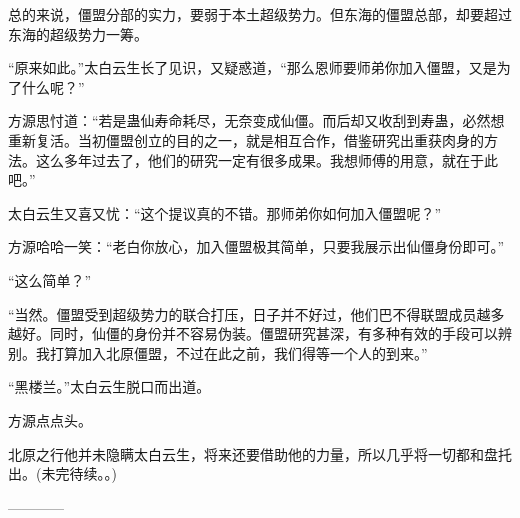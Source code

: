 \begin{this_body}
总的来说，僵盟分部的实力，要弱于本土超级势力。但东海的僵盟总部，却要超过东海的超级势力一筹。

“原来如此。”太白云生长了见识，又疑惑道，“那么恩师要师弟你加入僵盟，又是为了什么呢？”

方源思忖道：“若是蛊仙寿命耗尽，无奈变成仙僵。而后却又收刮到寿蛊，必然想重新复活。当初僵盟创立的目的之一，就是相互合作，借鉴研究出重获肉身的方法。这么多年过去了，他们的研究一定有很多成果。我想师傅的用意，就在于此吧。”

太白云生又喜又忧：“这个提议真的不错。那师弟你如何加入僵盟呢？”

方源哈哈一笑：“老白你放心，加入僵盟极其简单，只要我展示出仙僵身份即可。”

“这么简单？”

“当然。僵盟受到超级势力的联合打压，日子并不好过，他们巴不得联盟成员越多越好。同时，仙僵的身份并不容易伪装。僵盟研究甚深，有多种有效的手段可以辨别。我打算加入北原僵盟，不过在此之前，我们得等一个人的到来。”

“黑楼兰。”太白云生脱口而出道。

方源点点头。

北原之行他并未隐瞒太白云生，将来还要借助他的力量，所以几乎将一切都和盘托出。(未完待续。。)

------------

\end{this_body}

